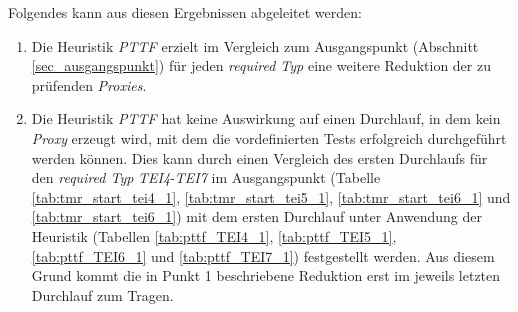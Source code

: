 \begin{multicols}{2}
\end{multicols}
\pagebreak
\begin{multicols}{2}
\end{multicols}
\noindent
Folgendes kann aus diesen Ergebnissen abgeleitet werden:
\begin{enumerate}
\item Die \Gls{Heuristik} \emph{PTTF} erzielt im Vergleich zum Ausgangspunkt (Abschnitt \ref{sec_ausgangspunkt}) für jeden \emph{required Typ} eine weitere Reduktion der zu prüfenden \emph{Proxies}.

\item Die Heuristik \emph{PTTF} hat keine Auswirkung auf einen Durchlauf, in dem kein \emph{Proxy} erzeugt wird, mit dem die vordefinierten Tests erfolgreich durchgeführt werden können. Dies kann durch einen Vergleich des ersten Durchlaufs für den \emph{required Typ} \emph{TEI4}-\emph{TEI7} im Ausgangspunkt (Tabelle \ref{tab:tmr_start_tei4_1}, \ref{tab:tmr_start_tei5_1}, \ref{tab:tmr_start_tei6_1} und \ref{tab:tmr_start_tei6_1}) mit dem ersten Durchlauf unter Anwendung der Heuristik (Tabellen \ref{tab:pttf_TEI4_1}, \ref{tab:pttf_TEI5_1}, \ref{tab:pttf_TEI6_1} und \ref{tab:pttf_TEI7_1}) festgestellt werden. Aus diesem Grund kommt die in Punkt 1 beschriebene Reduktion erst im jeweils letzten Durchlauf zum Tragen.
\end{enumerate}